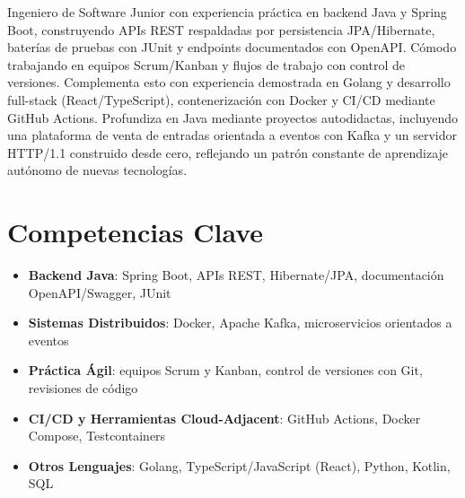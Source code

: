 \documentclass[11pt,a4paper,sans]{moderncv}
\begin{document}
\makecvtitle


\vspace{6pt}
\small{Ingeniero de Software Junior con experiencia práctica en backend Java y Spring Boot, construyendo APIs REST respaldadas por persistencia JPA/Hibernate, baterías de pruebas con JUnit y endpoints documentados con OpenAPI. Cómodo trabajando en equipos Scrum/Kanban y flujos de trabajo con control de versiones. Complementa esto con experiencia demostrada en Golang y desarrollo full-stack (React/TypeScript), contenerización con Docker y CI/CD mediante GitHub Actions. Profundiza en Java mediante proyectos autodidactas, incluyendo una plataforma de venta de entradas orientada a eventos con Kafka y un servidor HTTP/1.1 construido desde cero, reflejando un patrón constante de aprendizaje autónomo de nuevas tecnologías.}


\section{Competencias Clave}
\vspace{1pt}
\begin{itemize}

\item \textbf{Backend Java}: Spring Boot, APIs REST, Hibernate/JPA, documentación OpenAPI/Swagger, JUnit

\item \textbf{Sistemas Distribuidos}: Docker, Apache Kafka, microservicios orientados a eventos

\item \textbf{Práctica Ágil}: equipos Scrum y Kanban, control de versiones con Git, revisiones de código

\item \textbf{CI/CD y Herramientas Cloud-Adjacent}: GitHub Actions, Docker Compose, Testcontainers

\item \textbf{Otros Lenguajes}: Golang, TypeScript/JavaScript (React), Python, Kotlin, SQL

\end{itemize}

\end{document}
